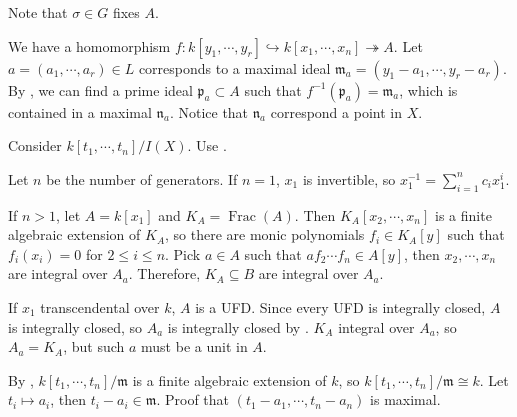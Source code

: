 \begin{exercise}\label{ex5.14}
	Note that $\sigma\in G$ fixes $A$.
\end{exercise}

\begin{exercise}\label{ex5.15}
	
\end{exercise}

\begin{exercise}\label{ex5.16}
	We have a homomorphism $f:k\left[y_1,\cdots,y_r\right]\hookrightarrow k\left[x_1,\cdots,x_n\right]\twoheadrightarrow  A$. Let $a=\left(a_1,\cdots,a_r\right)\in L$ corresponds to a maximal ideal $\mathfrak{m}_a=\left(y_1-a_1,\cdots,y_r-a_r\right)$. By , we can find a prime ideal $\mathfrak{p}_a\subset A$ such that $f^{-1}(\mathfrak{p}_a)=\mathfrak{m}_a$, which is contained in a maximal $\mathfrak{n}_a$. Notice that $\mathfrak{n}_a$ correspond a point in $X$.
\end{exercise}

\begin{exercise}\label{ex5.17}
	Consider $k\left[t_1,\cdots,t_n\right]/I(X)$. Use .
\end{exercise}

\begin{exercise}[\textcolor{red}{Zariski's lemma}]\label{ex5.18}
	Let $n$ be the number of generators. If $n=1$, $x_1$ is invertible, so $x_1^{-1}=\sum_{i=1}^nc_ix_1^i$.
	
	If $n>1$, let $A=k\left[x_1\right]$ and $K_A=\operatorname{Frac}(A)$. Then $K_A[x_2,\cdots,x_n]$ is a finite algebraic extension of $K_A$, so there are monic polynomials $f_i\in K_A[y]$ such that $f_i\left(x_i\right)=0$ for $2\leqslant i\leqslant n$. Pick $a\in A$ such that $af_2\cdots f_n\in A[y]$, then $x_2,\cdots,x_n$ are integral over $A_a$. Therefore, $K_A\subseteq B$ are integral over $A_a$.
	
	If $x_1$ transcendental over $k$, $A$ is a UFD. Since every UFD is integrally closed, $A$ is integrally closed, so $A_a$ is integrally closed by . $K_A$ integral over $A_a$, so $A_a=K_A$, but such $a$ must be a unit in $A$.
\end{exercise}

\begin{exercise}\label{ex5.19}
	By , $k\left[t_1,\cdots,t_n\right]/\mathfrak{m}$ is a finite algebraic extension of $k$, so $k\left[t_1,\cdots,t_n\right]/\mathfrak{m}\cong k$. Let $t_i\mapsto a_i$, then $t_i-a_i\in\mathfrak{m}$. Proof that $\left(t_1-a_1,\cdots,t_n-a_n\right)$ is maximal.
\end{exercise}

